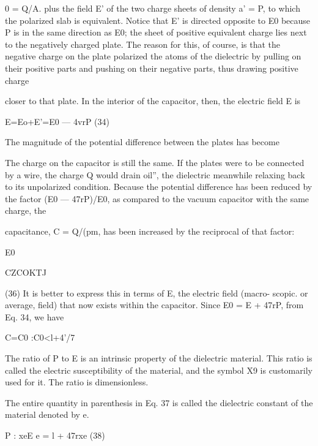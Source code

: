 {%
0 = Q/A. plus the field E' of the two charge sheets of density a' = P,
to which the polarized slab is equivalent. Notice that E' is directed
opposite to E0 because P is in the same direction as E0; the sheet of
positive equivalent charge lies next to the negatively charged plate.
The reason for this, of course, is that the negative charge on the plate
polarized the atoms of the dielectric by pulling on their positive parts
and pushing on their negative parts, thus drawing positive charge

closer to that plate. In the interior of the capacitor, then, the electric
field E is

\begin{equation}
\end{equation}
E=Eo+E'=E0 --- 4vrP (34)

The magnitude of the potential difference between the plates has
become

The charge on the capacitor is still the same. If the plates were to
be connected by a wire, the charge Q would drain oil'', the dielectric
meanwhile relaxing back to its unpolarized condition. Because the
potential difference has been reduced by the factor (E0  ---  47rP)/E0,
as compared to the vacuum capacitor with the same charge, the

capacitance, C = Q/(pm, has been increased by the reciprocal of that
factor:

\begin{equation}
\end{equation}
E0

CZCOKTJ

(36)
It is better to express this in terms of E, the electric field (macro-
scopic. or average, field) that now exists within the capacitor. Since
E0 = E + 47rP, from Eq. 34, we have

\begin{equation}
\end{equation}
C=C0 :C0<l+4'/7%

The ratio of P to E is an intrinsic property of the dielectric material.
This ratio is called the electric susceptibility of the material, and the
symbol X9 is customarily used for it. The ratio is dimensionless.

The entire quantity in parenthesis in Eq. 37 is called the dielectric
constant of the material denoted by e.

\begin{equation}
\end{equation}
P : xeE e = l + 47rxe (38)

}
